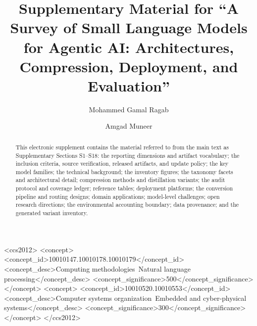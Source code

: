 \documentclass[acmsmall,screen,review]{acmart}
\begin{document}
\title[A Survey of Small Language Models for Agentic AI: Supplement]{Supplementary Material for
  ``A Survey of Small Language Models for Agentic AI: Architectures, Compression,
  Deployment, and Evaluation''}

\author{Mohammed Gamal Ragab}

\author{Amgad Muneer}

\renewcommand{\shortauthors}{Ragab and Muneer}

\begin{abstract}
  This electronic supplement contains the material referred to from the main
  text as Supplementary Sections S1--S18: the reporting dimensions and artifact
  vocabulary; the inclusion criteria, source verification, released artifacts,
  and update policy; the key model families; the technical background; the
  inventory figures; the taxonomy facets and architectural detail; compression
  methods and distillation variants; the audit protocol and coverage ledger;
  reference tables; deployment platforms; the conversion pipeline and routing
  designs; domain applications; model-level challenges; open research
  directions; the environmental accounting boundary; data provenance; and the
  generated variant inventory.
\end{abstract}

\begin{CCSXML}
<ccs2012>
   <concept>
       <concept_id>10010147.10010178.10010179</concept_id>
       <concept_desc>Computing methodologies~Natural language processing</concept_desc>
       <concept_significance>500</concept_significance>
   </concept>
   <concept>
       <concept_id>10010520.10010553</concept_id>
       <concept_desc>Computer systems organization~Embedded and cyber-physical systems</concept_desc>
       <concept_significance>300</concept_significance>
   </concept>
</ccs2012>
\end{CCSXML}

\end{document}
